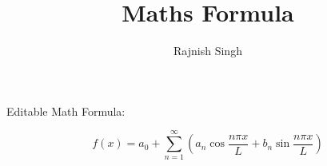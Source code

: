\documentclass{article}
\title{Maths Formula}
\author{Rajnish Singh}
\begin{document}
            \maketitle

            Editable Math Formula:

            \[
            f(x)=a_{0}+\sum_{n=1}^{\infty}\left(a_{n}\cos{\frac{n\pi x}{L}}+b_{n}\sin{\frac{n\pi x}{L}}\right)
            \]

            
\end{document}
